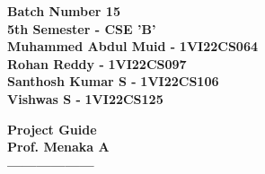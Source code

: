\documentclass[a4paper,12pt]{article}
\begin{document}
\begin{center}
    \vfill
    \begin{minipage}[b]{0.45\textwidth}
      \begin{center}
        {\fontsize{20}{0}\textbf{Batch Number 15}} \\[0.5em]
        \textbf{5th Semester - CSE 'B'}\\[0.5em]
        \textbf{Muhammed Abdul Muid - } \textbf{1VI22CS064}\\[0.5em]
        \textbf{Rohan Reddy - } \textbf{1VI22CS097}\\[0.5em]
        \textbf{Santhosh Kumar S - } \textbf{1VI22CS106}\\[0.5em]
        \textbf{Vishwas S - } \textbf{1VI22CS125}\\[3em]
      \end{center}
    \end{minipage}
    
    \vfill
    \begin{minipage}[b]{0.45\textwidth}
      \begin{center}        
        {\fontsize{20}{0}\textbf{Project Guide}} \\[0.5em]
        \textbf{Prof. Menaka A} \\[2em]
        \textbf{------------------} \\[0.5em]
      \end{center}
    \end{minipage}

\end{center}

\end{document}
